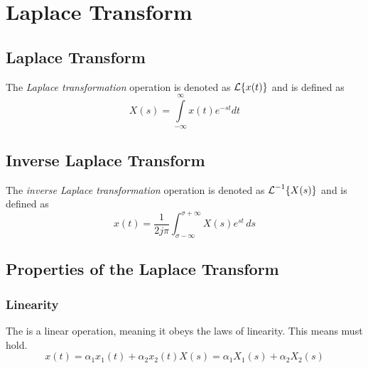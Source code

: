 \section{Laplace Transform}\label{app:Laplace_Transform}
\subsection{Laplace Transform}\label{subsec:Laplace_Transform}
\begin{definition}\label{def:Laplace_Transform}
  The \emph{Laplace transformation} operation is denoted as $\operatorname{\mathcal{L}} \lbrace x(t) \rbrace$ and is defined as
  \begin{equation}\label{eq:Laplace_Transform}
    X(s) = \int\limits_{-\infty}^{\infty} x(t) e^{-st} dt
  \end{equation}
\end{definition}

\subsection{Inverse Laplace Transform}\label{subsec:Inverse_Laplace_Transform}
\begin{definition}\label{def:Inverse_Laplace_Transform}
  The \emph{inverse Laplace transformation} operation is denoted as $\operatorname{\mathcal{L}}^{-1} \lbrace X(s) \rbrace$ and is defined as
  \begin{equation}\label{eq:Inverse_Laplace_Transform}
    x(t) = \frac{1}{2j \pi} \int_{\sigma-\infty}^{\sigma+\infty} X(s) e^{st} \, ds
  \end{equation}
\end{definition}

\subsection{Properties of the Laplace Transform}\label{subsec:Laplace_Transform_Properties}
\subsubsection{Linearity}\label{subsubsec:Laplace_Linearity}
The  is a linear operation, meaning it obeys the laws of linearity.
This means  must hold.
\begin{subequations}\label{eq:Laplace_Linearity}
  \begin{equation}\label{eq:Laplace_Linearity_Time}
    x(t) = \alpha_{1} x_{1}(t) + \alpha_{2} x_{2}(t)
  \end{equation}
  \begin{equation}\label{eq:Laplace_Linearity_Frequency}
    X(s) = \alpha_{1} X_{1}(s) + \alpha_{2} X_{2}(s)
  \end{equation}
\end{subequations}

